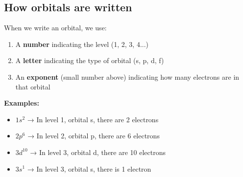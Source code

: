 \subsection{How orbitals are written}
When we write an orbital, we use:
\begin{enumerate}
    \item A \textbf{number} indicating the level (1, 2, 3, 4...)
    \item A \textbf{letter} indicating the type of orbital (s, p, d, f)
    \item An \textbf{exponent} (small number above) indicating how many electrons are in that orbital
\end{enumerate}
\textbf{Examples:}
\begin{itemize}
    \item \( 1s^2 \) → In level 1, orbital s, there are 2 electrons
    \item \( 2p^6 \) → In level 2, orbital p, there are 6 electrons
    \item \( 3d^{10} \) → In level 3, orbital d, there are 10 electrons
    \item \( 3s^1 \) → In level 3, orbital s, there is 1 electron
\end{itemize}
